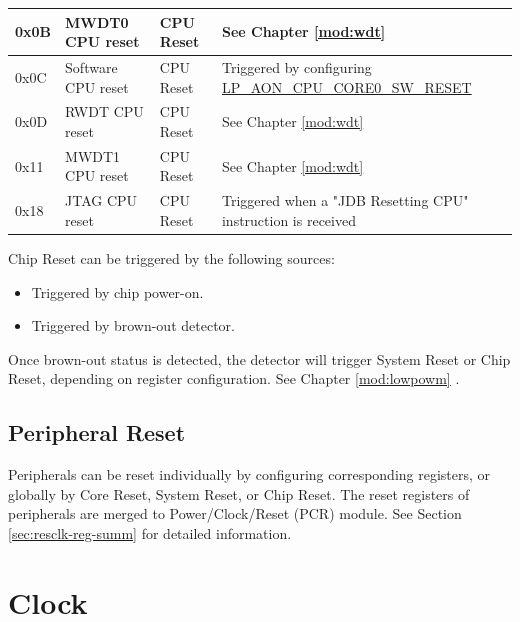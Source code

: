 \documentclass[main\_\_EN.tex]{subfiles}
\begin{document}
\begin{table}[H]
\begin{threeparttable}
\begin{tabular}{ |l|m{3.5cm}|m{1.8cm}|m{9.2cm}| }
        0x0B & MWDT0 CPU reset & CPU Reset & See Chapter \ref{mod:wdt} \textit{\nameref{mod:wdt}}
        \\\hline
         0x0C & Software CPU reset & CPU Reset & Triggered by configuring \hyperref[fielddesc:LPAONCPUCORE0SWRESET]{LP\_AON\_CPU\_CORE0\_SW\_RESET}\\
        \hline
        0x0D & RWDT CPU reset & CPU Reset & See Chapter \ref{mod:wdt} \textit{\nameref{mod:wdt}}
        \\\hline
        0x11 & MWDT1 CPU reset & CPU Reset & See Chapter \ref{mod:wdt} \textit{\nameref{mod:wdt}}
        \\\hline
        0x18 & JTAG CPU reset & CPU Reset & Triggered when a "JDB Resetting CPU" instruction is received
        \\\hline
\end{tabular}
        \begin{tablenotes}
            \item[1] Chip Reset can be triggered by the following sources:
                \begin{itemize}
                \item Triggered by chip power-on.
                \item Triggered by brown-out detector.
                \end{itemize}
            \item[2] Once brown-out status is detected, the detector will trigger System Reset or Chip Reset, depending on register configuration. See Chapter  \ref{mod:lowpowm} \textit{}.
        \end{tablenotes}
     \end{threeparttable}
    \end{table}


\subsection{Peripheral Reset}

Peripherals can be reset individually by configuring corresponding registers, or globally by Core Reset, System Reset, or Chip Reset. The reset registers of \chipname{} peripherals are merged to Power/Clock/Reset (PCR) module. See Section  \ref{sec:resclk-reg-summ} \textit{} for detailed information.

\section{Clock}
\end{document}
